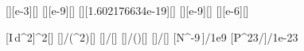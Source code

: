 [\milli\watt\per\square\meter][e-3][\watt\per\square\meter]
[\nano\meter][e-9][\meter]
[\electronvolt][1.602176634e-19][\joule]
[\nano\meter][e-9][\meter]
[\square\milli\meter][e-6][\square\meter]

[I\,d^2]{\IaX*\daX^2}[\watt]
[]{\WaX/(\IaX*\daX^2)}[\second]
[]{\nchX*\nccX/\laX}[\joule]
[]{\nchX*\nccX/(\nceX*\laX)}[\electronvolt]
[]{\IaX*\AaX/\EpX}[\per\second]
[N^{-9}\,]{\NrX/1e9}
[P^{23}/]{\PeX/1e-23}
